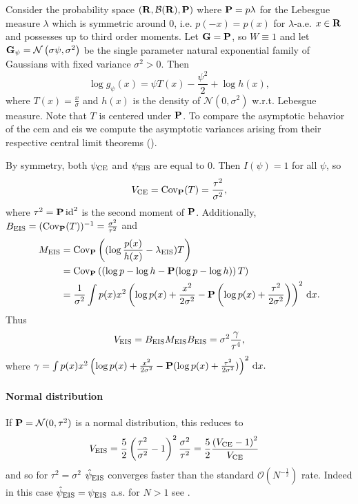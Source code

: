 \begin{example}
    \label{ex:univ-gaussian-s2-fixed}
    Consider the probability space $ \left( \R, \mathcal B(\R), \P \right)$ where $\P = p\lambda$ for the Lebesgue measure $\lambda$ which is symmetric around $0$, i.e. $p(-x) = p(x)$ for $\lambda$-a.e. $x\in\R$ and possesses up to third order moments.
    Let $\G=\P$, so $W\equiv1$ and let $\G_{\psi} = \mathcal N \left( \sigma\psi, \sigma^{2} \right)$ be the single parameter natural exponential family of Gaussians with fixed variance $\sigma^{2} > 0$. Then 
    $$
    \log g_{\psi}(x) = \psi T(x) - \frac{\psi^{2}}{2} + \log h(x),
    $$
    where $T(x) = \frac{x}{\sigma}$ and $h(x)$ is the density of $\mathcal N(0, \sigma^{2})$ w.r.t. Lebesgue measure. 
    Note that $T$ is centered under $\P$. To compare the asymptotic behavior of the \gls{cem} and \gls{eis} we compute the asymptotic variances arising from their respective central limit theorems ().

    By symmetry, both $\pce$ and $\peis$ are equal to $0$. 
    Then $I(\psi) = 1$ for all $\psi$, so 
    \begin{align}
    \label{eq:ce-gaussian-mean-var}
        V_{\ce} = \cov_{\P}(T) = \frac{\tau^{2}}{\sigma^{2}},
    \end{align}
    where $\tau^{2}=\P \operatorname{id}^{2}$ is the second moment of $\P$. 
    Additionally, $B_{\eis} = (\cov_{\P}(T))^{-1} = \frac{\sigma^{2}}{\tau^{2}}$ and
    \begin{align*}
    M_{\eis} &= \cov_{\P} \left( (\log \frac{p(x)}{h(x)} - \lambda_{\eis})T\right) \\
        &= \cov_{\P} \left(\left( \log p - \log h - \P (\log p - \log h) \right) T \right) \\
        &= \frac{1}{\sigma^{2}}\int p(x) x^{2}\left(\log p(x) + \frac{x^{2}}{2\sigma^{2}} - \P\left(\log p(x) + \frac{\tau^{2}}{2\sigma^{2}}\right)\right)^{2} \d x.
    \end{align*}
    Thus
    $$
    V_{\eis} = B_{\eis}M_{\eis}B_{\eis}= \sigma^{2}\frac{\gamma}{\tau^{4}},
    $$
    where $\gamma = \int p(x) x^{2}\left(\log p(x) + \frac{x^{2}}{2\sigma^{2}} - \P(\log p(x) + \frac{\tau^{2}}{2\sigma^{2}})\right)^{2} \d x.$
    
    \paragraph{Normal distribution}
    If $\P = \mathcal N(0, \tau^{2})$ is a normal distribution, this reduces to
    \begin{align*}
        V_{\eis} &= \frac{5}{2} \left( \frac{\tau^{2}}{\sigma^{2}} - 1 \right)^{2} \frac{\sigma^{2}}{\tau^{2}} = \frac{5}{2} \frac{\left( V_{\ce} - 1\right)^{2}}{V_{\ce}}
    \end{align*}
    and so for $\tau^{2} = \sigma^{2}$ $\hpeis$ converges faster than the standard $\mathcal O( N^{-\frac{1}{2}})$ rate. Indeed in this case $\hpeis = \peis$ a.s. for $N > 1$ see . 


\end{example}
